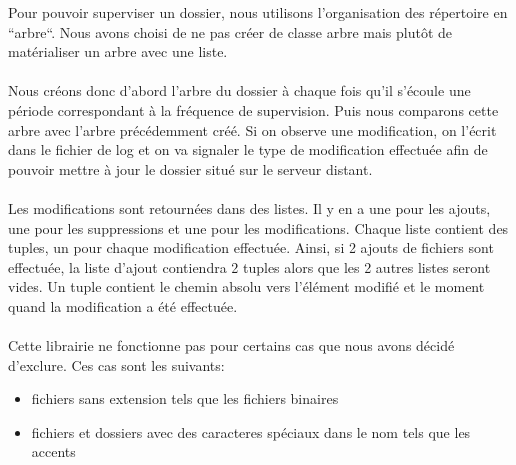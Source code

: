 Pour pouvoir superviser un dossier, nous utilisons l'organisation des répertoire en ``arbre``.
Nous avons choisi de ne pas créer de classe arbre mais plutôt de matérialiser un arbre avec une liste.\\
\\
Nous créons donc d'abord l'arbre du dossier à chaque fois qu'il s'écoule une période correspondant à la fréquence de supervision. 
Puis nous comparons cette arbre avec l'arbre précédemment créé. 
Si on observe une modification, on l'écrit dans le fichier de log et on va signaler le type de modification effectuée 
afin de pouvoir mettre à jour le dossier situé sur le serveur distant.\\
\\
Les modifications sont retournées dans des listes. Il y en a une pour les ajouts, une pour les suppressions et une pour les modifications.
Chaque liste contient des tuples, un pour chaque modification effectuée. 
Ainsi, si 2 ajouts de fichiers sont effectuée, la liste d'ajout contiendra 2 tuples alors que les 2 autres listes seront vides.
Un tuple contient le chemin absolu vers l'élément modifié et le moment quand la modification a été effectuée.\\
\\
Cette librairie ne fonctionne pas pour certains cas que nous avons décidé d'exclure. Ces cas sont les suivants:
\begin{itemize}
\item fichiers sans extension tels que les fichiers binaires
\item fichiers et dossiers avec des caracteres spéciaux dans le nom tels que les accents
\end{itemize}



